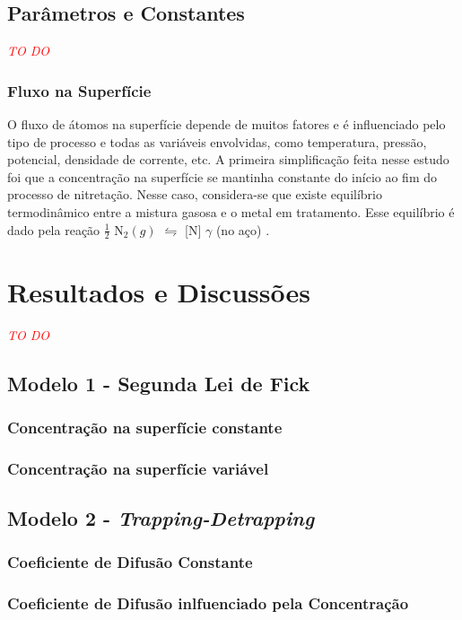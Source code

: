 \documentclass[]{politex}
\newcommand\myworries[1]{\textcolor{red}{#1}}
\begin{document}
\section{Parâmetros e Constantes}
\label{sec:params}
\myworries{\textit{TO DO}}
\subsection{Fluxo na Superfície}
O fluxo de átomos na superfície depende de muitos fatores e é influenciado pelo tipo de processo e todas as variáveis envolvidas, como temperatura, pressão, potencial, densidade de corrente, etc.
A primeira simplificação feita nesse estudo foi que a concentração na superfície se mantinha constante do início ao fim do processo de nitretação. Nesse caso, considera-se que existe equilíbrio termodinâmico entre a  mistura gasosa e o metal em tratamento. Esse equilíbrio é dado pela reação $\frac{1}{2}$ N${_2(g)}$ $\leftrightharpoons$ [N] $\gamma$ (no aço) \cite{tschiptschin2000thermodynamics}.


\chapter{Resultados e Discussões}
\myworries{\textit{TO DO}}
\section{Modelo 1 - Segunda Lei de Fick}

\subsection{Concentração na superfície constante}
\label{sec:modelo11}

\subsection{Concentração na superfície variável}
\label{sec:modelo12}

\section{Modelo 2 - \textit{Trapping-Detrapping}}
\subsection{Coeficiente de Difusão Constante}
\label{sec:modelo21}

\subsection{Coeficiente de Difusão inlfuenciado pela Concentração}
\label{sec:modelo22}
\end{document}
